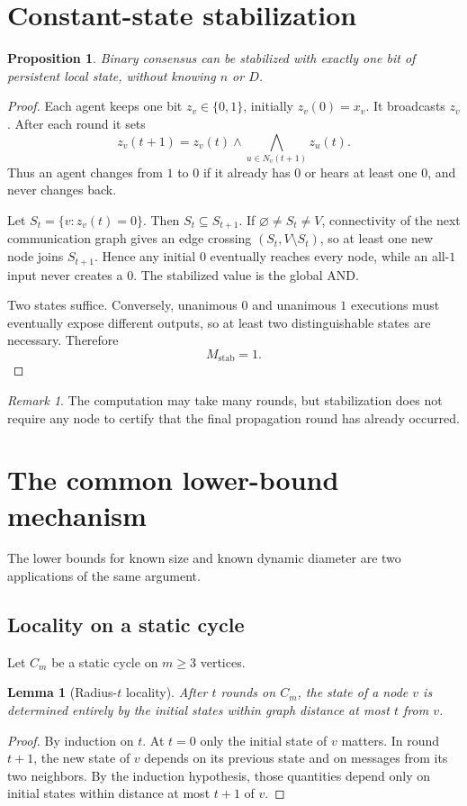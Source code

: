 \documentclass[11pt]{article}
\newtheorem{lemma}{Lemma}
\newtheorem{proposition}{Proposition}
\theoremstyle{remark}
\newtheorem{remark}{Remark}
\begin{document}
\section{Constant-state stabilization}
\begin{proposition}
Binary consensus can be stabilized with exactly one bit of persistent local state, without knowing $n$ or $D$.
\end{proposition}
\begin{proof}
Each agent keeps one bit $z_v\in\{0,1\}$, initially $z_v(0)=x_v$. It broadcasts $z_v$. After each round it sets
\[
z_v(t+1)=z_v(t)\wedge\bigwedge_{u\in N_v(t+1)}z_u(t).
\]
Thus an agent changes from $1$ to $0$ if it already has $0$ or hears at least one $0$, and never changes back.

Let $S_t=\{v:z_v(t)=0\}$. Then $S_t\subseteq S_{t+1}$. If $\varnothing\neq S_t\neq V$, connectivity of the next communication graph gives an edge crossing $(S_t,V\setminus S_t)$, so at least one new node joins $S_{t+1}$. Hence any initial $0$ eventually reaches every node, while an all-$1$ input never creates a $0$. The stabilized value is the global AND.

Two states suffice. Conversely, unanimous $0$ and unanimous $1$ executions must eventually expose different outputs, so at least two distinguishable states are necessary. Therefore
\[
\boxed{M_{\mathrm{stab}}=1.}
\]
\end{proof}

\begin{remark}
The computation may take many rounds, but stabilization does not require any node to certify that the final propagation round has already occurred.
\end{remark}

\section{The common lower-bound mechanism}
The lower bounds for known size and known dynamic diameter are two applications of the same argument.

\subsection{Locality on a static cycle}
Let $C_m$ be a static cycle on $m\ge3$ vertices.

\begin{lemma}[Radius-$t$ locality]
After $t$ rounds on $C_m$, the state of a node $v$ is determined entirely by the initial states within graph distance at most $t$ from $v$.
\end{lemma}
\begin{proof}
By induction on $t$. At $t=0$ only the initial state of $v$ matters. In round $t+1$, the new state of $v$ depends on its previous state and on messages from its two neighbors. By the induction hypothesis, those quantities depend only on initial states within distance at most $t+1$ of $v$.
\end{proof}
\end{document}
